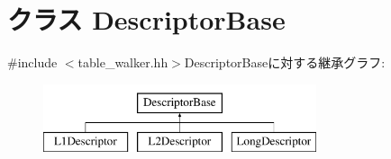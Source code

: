 \hypertarget{classArmISA_1_1TableWalker_1_1DescriptorBase}{
\section{クラス DescriptorBase}
\label{classArmISA_1_1TableWalker_1_1DescriptorBase}
}


{\ttfamily \#include $<$table\_\-walker.hh$>$}DescriptorBaseに対する継承グラフ:\begin{figure}[H]
\begin{center}
\leavevmode
\includegraphics[height=2cm]{classArmISA_1_1TableWalker_1_1DescriptorBase}
\end{center}
\end{figure}
